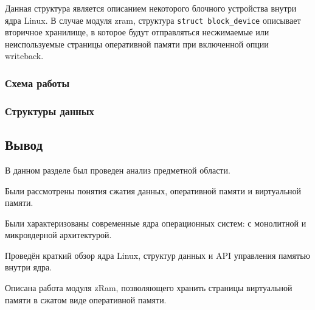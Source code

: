 Данная структура является описанием некоторого блочного устройства внутри ядра Linux. В случае модуля zram, структура \texttt{struct block\_device} описывает вторичное хранилище, в которое будут отправляться несжимаемые или неиспользуемые страницы оперативной памяти при включенной опции\\ writeback.


\subsubsection{Схема работы}

\subsubsection{Структуры данных}

\subsection{Вывод}

В данном разделе был проведен анализ предметной области. 

Были рассмотрены понятия сжатия данных, оперативной памяти и виртуальной памяти. 

Были характеризованы современные ядра операционных систем: с монолитной и микроядерной архитектурой. 

Проведён краткий обзор ядра Linux, структур данных и API управления памятью внутри ядра.

Описана работа модуля zRam, позволяющего хранить страницы виртуальной памяти в сжатом виде оперативной памяти.

\pagebreak
